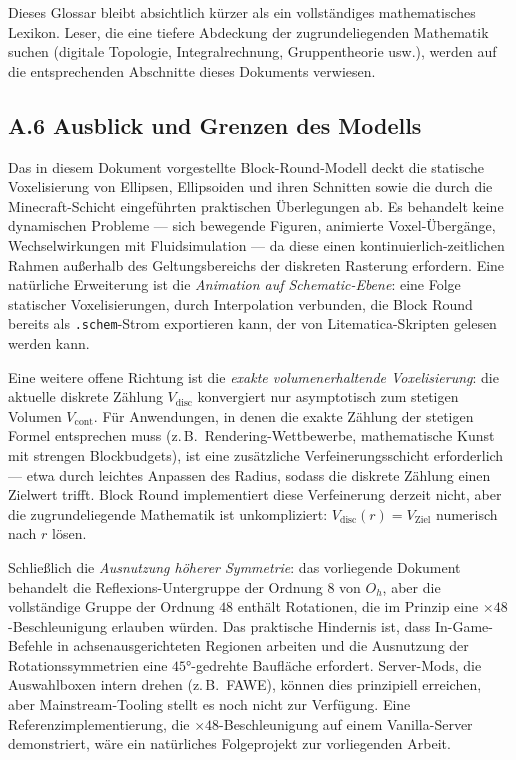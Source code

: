 \documentclass[12pt,a4paper]{scrartcl}
\newcommand{\code}[1]{\texttt{\small #1}}
\begin{document}
Dieses Glossar bleibt absichtlich kürzer als ein vollständiges mathematisches Lexikon. Leser, die eine tiefere Abdeckung der zugrundeliegenden Mathematik suchen (digitale Topologie, Integralrechnung, Gruppentheorie usw.), werden auf die entsprechenden Abschnitte dieses Dokuments verwiesen.

\subsection*{A.6 Ausblick und Grenzen des Modells}

Das in diesem Dokument vorgestellte Block-Round-Modell deckt die statische Voxelisierung von Ellipsen, Ellipsoiden und ihren Schnitten sowie die durch die Minecraft-Schicht eingeführten praktischen Überlegungen ab. Es behandelt keine dynamischen Probleme --- sich bewegende Figuren, animierte Voxel-Übergänge, Wechselwirkungen mit Fluidsimulation --- da diese einen kontinuierlich-zeitlichen Rahmen außerhalb des Geltungsbereichs der diskreten Rasterung erfordern. Eine natürliche Erweiterung ist die \emph{Animation auf Schematic-Ebene}: eine Folge statischer Voxelisierungen, durch Interpolation verbunden, die Block Round bereits als \code{.schem}-Strom exportieren kann, der von Litematica-Skripten gelesen werden kann.

Eine weitere offene Richtung ist die \emph{exakte volumenerhaltende Voxelisierung}: die aktuelle diskrete Zählung $V_{\mathrm{disc}}$ konvergiert nur asymptotisch zum stetigen Volumen $V_{\mathrm{cont}}$. Für Anwendungen, in denen die exakte Zählung der stetigen Formel entsprechen muss (z.\,B.\ Rendering-Wettbewerbe, mathematische Kunst mit strengen Blockbudgets), ist eine zusätzliche Verfeinerungsschicht erforderlich --- etwa durch leichtes Anpassen des Radius, sodass die diskrete Zählung einen Zielwert trifft. Block Round implementiert diese Verfeinerung derzeit nicht, aber die zugrundeliegende Mathematik ist unkompliziert: $V_{\mathrm{disc}}(r) = V_{\mathrm{Ziel}}$ numerisch nach $r$ lösen.

Schließlich die \emph{Ausnutzung höherer Symmetrie}: das vorliegende Dokument behandelt die Reflexions-Untergruppe der Ordnung $8$ von $O_h$, aber die vollständige Gruppe der Ordnung $48$ enthält Rotationen, die im Prinzip eine $\times 48$-Beschleunigung erlauben würden. Das praktische Hindernis ist, dass In-Game-Befehle in achsenausgerichteten Regionen arbeiten und die Ausnutzung der Rotationssymmetrien eine $45°$-gedrehte Baufläche erfordert. Server-Mods, die Auswahlboxen intern drehen (z.\,B.\ FAWE), können dies prinzipiell erreichen, aber Mainstream-Tooling stellt es noch nicht zur Verfügung. Eine Referenzimplementierung, die $\times 48$-Beschleunigung auf einem Vanilla-Server demonstriert, wäre ein natürliches Folgeprojekt zur vorliegenden Arbeit.
\end{document}

